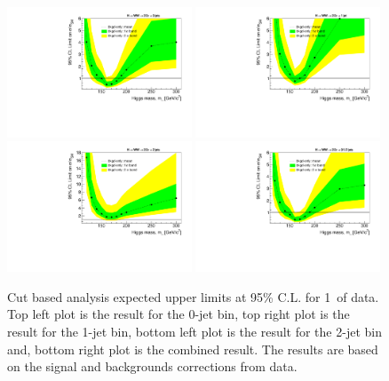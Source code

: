 \begin{figure}[!htbp]
\begin{center}
   \includegraphics[width=0.49\textwidth]{figures/limits_0j_1000pb_datalike_cut_1.pdf}
   \includegraphics[width=0.49\textwidth]{figures/limits_1j_1000pb_datalike_cut_1.pdf}
   \includegraphics[width=0.49\textwidth]{figures/limits_2j_1000pb_datalike_cut_1.pdf}
   \includegraphics[width=0.49\textwidth]{figures/limits_nj_1000pb_datalike_cut_1.pdf}
   \caption{Cut based analysis expected upper limits at 95\% C.L. for 1\ifb\ of data. Top left plot 
   is the result for the 0-jet bin, top right plot is the result for the 1-jet bin, bottom left plot 
   is the result for the 2-jet bin and, bottom right plot is the combined result. The results 
   are based on the signal and backgrounds corrections from data.}
   \label{fig:cutbase_uls_datalike}
\end{center}
\end{figure}

